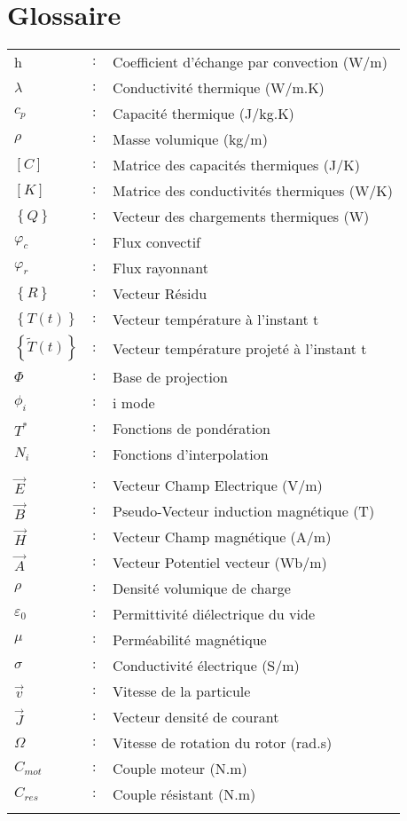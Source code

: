 \chapter*{Glossaire}
\begin{bibunit}[ieeetr]

\begin{table}[h!]
\begin{tabular}{p{1cm}p{0.5cm}p{10cm}}

h & $:$ & Coefficient d'échange par convection (W/m\up{2})\\
$\lambda$ & $:$ &Conductivité thermique (W/m.K)\\
$c_p$ & $:$ &Capacité thermique (J/kg.K)\\
$\rho$ & $:$ &Masse volumique (kg/m\up{3})\\
$[C]$ & $:$ &Matrice des capacités thermiques (J/K)\\
$[K]$ & $:$ &Matrice des conductivités thermiques (W/K)\\
$\left\{ Q \right\}$ & $:$ &Vecteur des chargements thermiques (W)\\
$\varphi_c$ & $:$ & Flux convectif\\
$\varphi_r$ & $:$ & Flux rayonnant\\
$\left\{ R \right\}$ & $:$ & Vecteur Résidu\\
$\left\{ T(t) \right\}$ & $:$ & Vecteur température à l'instant t\\
$\left\{ \tilde T(t) \right\}$ & $:$ & Vecteur température projeté à l'instant t\\
$\Phi$ & $:$ & Base de projection\\
$\phi_i$ & $:$ & i\up{ième} mode\\
${T^*}$ & $:$ & Fonctions de pondération\\
${N_i}$ & $:$ & Fonctions d'interpolation\\
\\

$\overrightarrow E$ & $:$ & Vecteur Champ Electrique (V/m)\\
$\overrightarrow B$ & $:$ & Pseudo-Vecteur induction magnétique (T)\\
$\overrightarrow H$ & $:$ & Vecteur Champ magnétique (A/m)\\
$\overrightarrow A$ & $:$ & Vecteur Potentiel vecteur (Wb/m)\\
$\rho $ & $:$ & Densité volumique de charge\\
${\varepsilon _0}$ & $:$ & Permittivité diélectrique du vide\\
$\mu$ & $:$ & Perméabilité magnétique\\
$\sigma $ & $:$ & Conductivité électrique (S/m)\\
$\overrightarrow v $ & $:$ &  Vitesse de la particule\\
$\overrightarrow J $ & $:$ &  Vecteur densité de courant\\
$\Omega$ & $:$ &  Vitesse de rotation du rotor (rad.s)\\
$C_{mot}$ & $:$ &  Couple moteur (N.m)\\
$C_{res}$ & $:$ &  Couple résistant (N.m)\\
\\


\end{tabular}
\end{table}
\end{bibunit}
